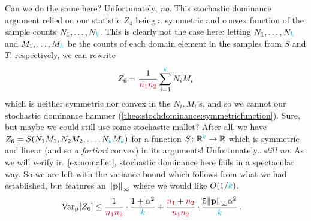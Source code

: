 Can we do the same here? Unfortunately, \emph{no}. This stochastic dominance argument relied on our statistic $Z_4$ being a symmetric and convex function of the sample counts $N_1,\dots, N_{\textcolor{cyan}{k}}$. This is clearly not the case here: letting $N_1,\dots,N_{\textcolor{cyan}{k}}$ and $M_1,\dots,M_{\textcolor{cyan}{k}}$ be the counts of each domain element in the samples from $S$ and $T$, respectively, we can rewrite
\begin{equation}
    Z_6 = \frac{1}{\textcolor{red}{{\textcolor{purple}{n}}_1}\textcolor{red}{{\textcolor{purple}{n}}_2}}\sum_{i=1}^{\textcolor{cyan}{k}} N_i M_i
\end{equation}
which is neither symmetric nor convex in the $N_i,M_i$'s, and so we cannot our stochastic dominance hammer (\cref{theo:stochdominance:symmetricfunction}). Sure, but maybe we could still use some stochastic mallet? After all, we have $Z_6 = S(N_1M_1,N_2M_2,\dots,N_{\textcolor{cyan}{k}} M_{\textcolor{cyan}{k}})$ for a function $S\colon\mathbb{R}^{\textcolor{cyan}{k}}\to\mathbb{R}$ which is symmetric and linear (and so \textit{a fortiori} convex) in its arguments! Unfortunately\dots \emph{still no.} As we will verify in~\cref{ex:nomallet}, stochastic dominance here fails in a spectacular way. So we are left with the variance bound which follows from what we had established, but features an $\norminf{\p}$ where we would like $O(1/{\textcolor{cyan}{k}})$.
\begin{align}
  \Var_\p[Z_6]
  &\leq \frac{1}{\nss\nst}\cdot \frac{1+\alpha^2}{\ab} + \frac{\nss+\nst}{\nss\nst}\cdot \frac{5\norminf{\p}\alpha^2}{\ab} \label{eq:var:bipartite:collisions:infty}\,.
\end{align}

